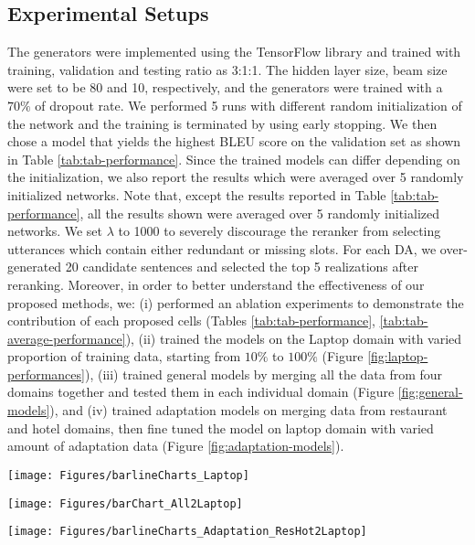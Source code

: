 \documentclass[11pt,a4paper]{article}
\begin{document}
\subsection{Experimental Setups}\label{subsec:experimental-setups}
The generators were implemented using the TensorFlow library \cite{abadi2016tensorflow} and trained with training, validation and testing ratio as 3:1:1. The hidden layer size, beam size were set to be 80 and 10, respectively, and the generators were trained with a $70\%$ of dropout rate. We performed 5 runs with different random initialization of the network and the training is terminated by using early stopping. We then chose a model that yields the highest BLEU score on the validation set as shown in Table \ref{tab:tab-performance}. Since the trained models can differ depending on the initialization, we also report the results which were averaged over 5 randomly initialized networks. Note that, except the results reported in Table \ref{tab:tab-performance}, all the results shown were averaged over 5 randomly initialized networks. We set $\lambda$ to 1000 to severely discourage the reranker from selecting utterances which contain either redundant or missing slots. For each DA, we over-generated 20 candidate sentences and selected the top 5 realizations after reranking. Moreover, in order to better understand the effectiveness of our proposed methods, we: (i) performed an ablation experiments to demonstrate the contribution of each proposed cells (Tables \ref{tab:tab-performance}, \ref{tab:tab-average-performance}), (ii) trained the models on the Laptop domain with varied proportion of training data, starting from $10\%$ to $100\%$ (Figure \ref{fig:laptop-performances}), (iii) trained general models by merging all the data from four domains together and tested them in each individual domain (Figure \ref{fig:general-models}), and (iv) trained adaptation models on merging data from restaurant and hotel domains, then fine tuned the model on laptop domain with varied amount of adaptation data (Figure \ref{fig:adaptation-models}).

\begin{figure*}[!ht]
	\centering 
    \texttt{[image: Figures/barlineCharts\_Laptop]}
    \caption{Performance comparison of the models trained on Laptop domain.}
    \label{fig:laptop-performances}
\end{figure*}
\begin{figure*}[!ht]
	\centering 
    \texttt{[image: Figures/barChart\_All2Laptop]}
    \caption{Performance comparison of the general models on four different domains.}
    \label{fig:general-models}
\end{figure*}
\begin{figure*}[!ht]
	\centering 
    \texttt{[image: Figures/barlineCharts\_Adaptation\_ResHot2Laptop]}
    \caption{Performance on Laptop domain with varied amount of the adaptation training data when adapting models trained on Restaurant+Hotel dataset.}
    \label{fig:adaptation-models}
\end{figure*}
\end{document}
